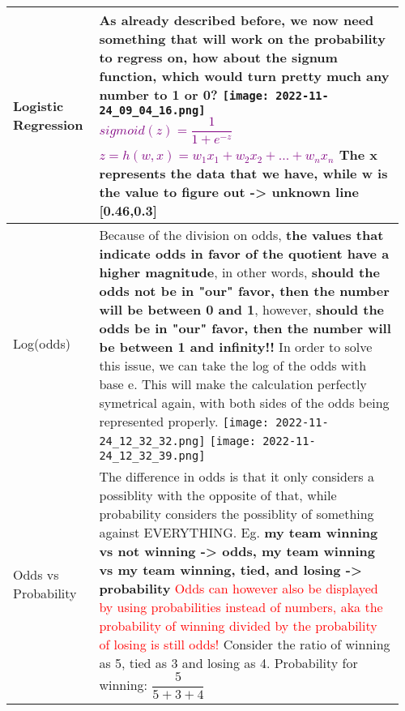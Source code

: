 \documentclass[main.tex,fontsize=8pt,paper=a4,paper=portrait,DIV=calc,]{scrartcl}
\begin{document}
\pagebreak
\begin{table}[ht!]
\begin{tabular}{|m{0.2\linewidth}|m{0.755\linewidth}|}
\hline
Logistic Regression & 
As already described before, we now need something that will work on the probability to regress on, how about the signum function, which would turn pretty much any number to 1 or 0?\newline
\minipg{
\texttt{[image: 2022-11-24\_09\_04\_16.png]}\newline
}{
  \large \textcolor{purple}{\( sigmoid(z) = \dfrac{1}{1 + e^{-z}}\)}\newline
  \large \textcolor{purple}{\( z = h(w,x) = w_1x_1 + w_2x_2 + \text{...} + w_nx_n \)}\newline
  \normalsize \textbf{The x represents the data that we have, while w is the value to figure out -> unknown line}
}[0.46,0.3]
\\
\hline
Log(odds) & 
Because of the division on odds, \textbf{the values that indicate odds in favor of the quotient have a higher magnitude}, in other words, \textbf{should the odds not be in "our" favor, then the number will be between 0 and 1}, however, \textbf{should the odds be in "our" favor, then the number will be between 1 and infinity!!}\newline
In order to solve this issue, we can take the log of the odds with base e.\newline
This will make the calculation perfectly symetrical again, with both sides of the odds being represented properly.\newline
\texttt{[image: 2022-11-24\_12\_32\_32.png]} \texttt{[image: 2022-11-24\_12\_32\_39.png]}
\\
\hline
Odds vs Probability & 
The difference in odds is that it only considers a possiblity with the opposite of that, while probability considers the possiblity of something against EVERYTHING.\newline
Eg. \textbf{my team winning vs not winning -> odds, my team winning vs my team winning, tied, and losing -> probability}\newline
\textcolor{red}{Odds can however also be displayed by using probabilities instead of numbers, aka the probability of winning divided by the probability of losing is still odds!}\newline
Consider the ratio of winning as 5, tied as 3 and losing as 4.\newline
Probability for winning: \( \dfrac{5}{5+3+4} \) \newline

\end{tabular}
\end{table}
\end{document}

